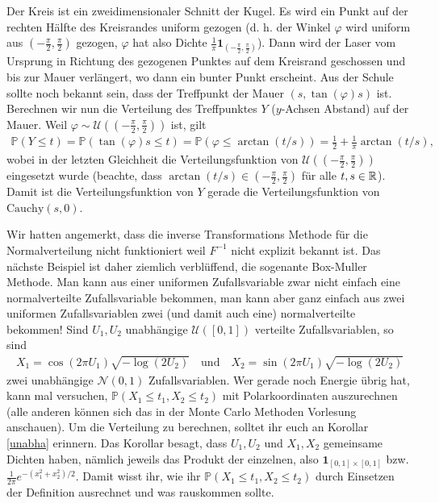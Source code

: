 \begin{beispiel}
\begin{center}
\end{center}
Der Kreis ist ein zweidimensionaler Schnitt der Kugel. Es wird ein Punkt auf der rechten H\"alfte des Kreisrandes uniform gezogen (d. h. der Winkel $\varphi$ wird uniform aus $(-\frac{\pi}{2},\frac{\pi}{2})$ gezogen, $\varphi$ hat also Dichte $\frac 1 \pi \mathbf{1}_{(-\frac \pi 2, \frac \pi 2)}$). Dann wird der Laser vom Ursprung in Richtung des gezogenen Punktes auf dem Kreisrand geschossen und bis zur Mauer verl\"angert, wo dann ein bunter Punkt erscheint. Aus der Schule sollte noch bekannt sein, dass der Treffpunkt der Mauer $(s,\tan(\varphi)s)$ ist. Berechnen wir nun die Verteilung des Treffpunktes $Y$ ($y$-Achsen Abstand) auf der Mauer. Weil $\varphi\sim \mathcal U((-\frac{\pi}{2},\frac{\pi}{2}))$ ist, gilt
\begin{align*}
	\mathbb P(Y\leq t)=\mathbb P(\tan(\varphi) s\leq t)=\mathbb P(\varphi \leq \arctan(t/s))=\frac{1}{2}+\frac{1}{\pi}\arctan(t/s),
	\end{align*}
wobei in der letzten Gleichheit die Verteilungsfunktion von $\mathcal U((-\frac{\pi}{2},\frac{\pi}{2}))$ eingesetzt wurde (beachte, dass $\arctan(t/s)\in (-\frac{\pi}{2},\frac{\pi}{2})$ f\"ur alle $t,s\in\mathbb{R}$). Damit ist die Verteilungsfunktion von $Y$ gerade die Verteilungsfunktion von $\text{Cauchy}(s,0)$.
\end{beispiel}

Wir hatten angemerkt, dass die inverse Transformations Methode f\"ur die Normalverteilung nicht funktioniert weil $F^{-1}$ nicht explizit bekannt ist. Das n\"achste Beispiel ist daher ziemlich verbl\"uffend, die sogenante Box-Muller Methode. Man kann aus einer uniformen Zufallsvariable zwar nicht einfach eine normalverteilte Zufallsvariable bekommen, man kann aber ganz einfach aus zwei uniformen Zufallsvariablen zwei (und damit auch eine) normalverteilte bekommen! Sind $U_1, U_2$ unabh\"angige $\mathcal U([0,1])$ verteilte Zufallsvariablen, so sind 
\begin{align*}
	X_1=\cos(2\pi U_1) \sqrt{-\log(2U_2)}\quad \text{und}\quad
	X_2=\sin(2\pi U_1) \sqrt{-\log(2U_2)}
\end{align*}
zwei unabh\"angige $\mathcal N(0,1)$ Zufallsvariablen. Wer gerade noch Energie \"ubrig hat, kann mal versuchen, $\mathbb P(X_1\leq t_1,X_2\leq t_2)$ mit Polarkoordinaten auszurechnen (alle anderen k\"onnen sich das in der Monte Carlo Methoden Vorlesung anschauen). Um die Verteilung zu berechnen, solltet ihr euch an Korollar \ref{unabha} erinnern. Das Korollar besagt, dass $U_1,U_2$ und $X_1,X_2$ gemeinsame Dichten haben, n\"amlich jeweils das Produkt der einzelnen, also $\mathbf 1_{[0,1]\times [0,1]}$ bzw. $\frac{1}{2\pi} e^{-(x_1^2+x_2^2)/2}$. Damit wisst ihr, wie ihr $\mathbb P(X_1\leq t_1,X_2\leq t_2)$ durch Einsetzen der Definition ausrechnet und was rauskommen sollte.



